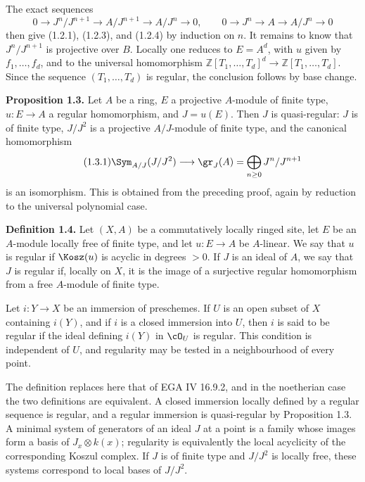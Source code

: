 The exact sequences
\[
0\to J^n/J^{n+1}\to A/J^{n+1}\to A/J^n\to0,
\qquad
0\to J^n\to A\to A/J^n\to0
\]
then give (1.2.1), (1.2.3), and (1.2.4) by induction on \(n\). It remains to know that \(J^n/J^{n+1}\) is projective over \(B\). Locally one reduces to \(E=A^d\), with \(u\) given by \(f_1,\ldots,f_d\), and to the universal homomorphism \(\mathbb Z[T_1,\ldots,T_d]^d\to \mathbb Z[T_1,\ldots,T_d]\). Since the sequence \((T_1,\ldots,T_d)\) is regular, the conclusion follows by base change.

\textbf{Proposition 1.3.} Let \(A\) be a ring, \(E\) a projective \(A\)-module of finite type, \(u:E\to A\) a regular homomorphism, and \(J=u(E)\). Then \(J\) is quasi-regular: \(J\) is of finite type, \(J/J^2\) is a projective \(A/J\)-module of finite type, and the canonical homomorphism
\begin{equation}\tag{1.3.1}
 \Sym_{A/J}(J/J^2)\longrightarrow \gr_J(A)=\bigoplus_{n\ge0}J^n/J^{n+1}
\end{equation}
is an isomorphism. This is obtained from the preceding proof, again by reduction to the universal polynomial case.

\textbf{Definition 1.4.} Let \((X,A)\) be a commutatively locally ringed site, let \(E\) be an \(A\)-module locally free of finite type, and let \(u:E\to A\) be \(A\)-linear. We say that \(u\) is regular if \(\Kosz(u)\) is acyclic in degrees \(>0\). If \(J\) is an ideal of \(A\), we say that \(J\) is regular if, locally on \(X\), it is the image of a surjective regular homomorphism from a free \(A\)-module of finite type.

Let \(i:Y\to X\) be an immersion of preschemes. If \(U\) is an open subset of \(X\) containing \(i(Y)\), and if \(i\) is a closed immersion into \(U\), then \(i\) is said to be regular if the ideal defining \(i(Y)\) in \(\cO_U\) is regular. This condition is independent of \(U\), and regularity may be tested in a neighbourhood of every point.

The definition replaces here that of EGA IV 16.9.2, and in the noetherian case the two definitions are equivalent. A closed immersion locally defined by a regular sequence is regular, and a regular immersion is quasi-regular by Proposition 1.3. A minimal system of generators of an ideal \(J\) at a point is a family whose images form a basis of \(J_x\otimes k(x)\); regularity is equivalently the local acyclicity of the corresponding Koszul complex. If \(J\) is of finite type and \(J/J^2\) is locally free, these systems correspond to local bases of \(J/J^2\).

